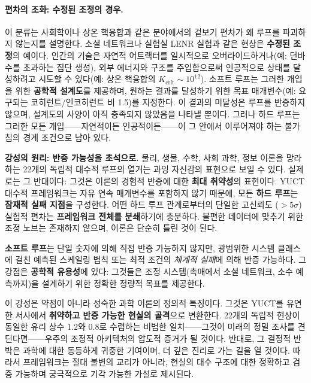 \documentclass[12pt,a4paper]{article}
\begin{document}
	\paragraph{편차의 조화: 수정된 조정의 경우.}
	이 분류는 사회학이나 상온 핵융합과 같은 분야에서의 겉보기 편차가 왜 루프를 파괴하지 않는지를 설명한다. 소셜 네트워크나 실험실 LENR 실험과 같은 현상은 \textbf{수정된 조정}의 예이다. 인간의 기술은 자연적 어트랙터를 일시적으로 오버라이드하거나(예: 던바 수를 초과하는 집단 생성), 외부 에너지와 구조를 주입함으로써 인공적으로 상태를 달성하려고 시도할 수 있다(예: 상온 핵융합의 \(K_{\mathrm{crit}} \sim 10^{12}\)). 소프트 루프는 그러한 개입을 위한 \textbf{공학적 설계도}를 제공하며, 원하는 결과를 달성하기 위한 목표 매개변수(예: 요구되는 코히런트/인코히런트 비 1.5)를 지정한다. 이 결과의 미달성은 루프를 반증하지 않으며, 설계도의 사양이 아직 충족되지 않았음을 나타낼 뿐이다. 그러나 하드 루프는 그러한 모든 개입——자연적이든 인공적이든——이 그 안에서 이루어져야 하는 불가침의 경계 조건으로 남아 있다.
	
	\vspace{0.5cm}
	\noindent
	\textbf{강성의 원리: 반증 가능성을 초석으로.}
	물리, 생물, 수학, 사회 과학, 정보 이론을 망라하는 22개의 독립적 대수적 루프의 열거는 과잉 자신감의 표현으로 보일 수 있다. 실제로는 그 반대이다: 그것은 이론의 경험적 반증에 대한 \textbf{최대 취약성}의 표현이다. YUCT 대수적 프레임워크는 자유 연속 매개변수를 포함하지 않기 때문에, 모든 \textbf{하드 루프}는 \textbf{잠재적 실패 지점}을 구성한다. 어떤 하드 루프 관계로부터의 단일한 고신뢰도 (\(>5\sigma\)) 실험적 편차는 \textbf{프레임워크 전체를 분쇄}하기에 충분하다. 불편한 데이터에 맞추기 위한 조정 노브는 존재하지 않으며, 이론은 단순히 틀린 것이 된다.
	
	\textbf{소프트 루프}는 단일 숫자에 의해 직접 반증 가능하지 않지만, 광범위한 시스템 클래스에 걸친 예측된 스케일링 법칙 또는 최적 조건의 \textit{체계적 실패}에 의해 반증 가능하다. 그 강점은 \textbf{공학적 유용성}에 있다: 그것들은 조정 시스템(촉매에서 소셜 네트워크, 소수 예측까지)을 설계하기 위한 정확한 정량적 목표를 제공한다.
	
	이 강성은 약점이 아니라 성숙한 과학 이론의 정의적 특징이다. 그것은 YUCT를 유연한 서사에서 \textbf{취약하고 반증 가능한 현실의 골격}으로 변환한다. 22개의 독립적 현상이 동일한 유리 상수 \(1.2\)와 \(0.8\)로 수렴하는 비범한 일치——그것이 미래의 정밀 조사를 견딘다면——우주의 조정적 아키텍처의 압도적 증거가 될 것이다. 반대로, 그 결정적 반박은 과학에 대한 동등하게 귀중한 기여이며, 더 깊은 진리로 가는 길을 열 것이다. 따라서 프레임워크는 절대 불변의 교리가 아니라, 현실의 대수 구조에 대한 정확하고 검증 가능하며 궁극적으로 기각 가능한 가설로 제시된다.
	
\end{document}
